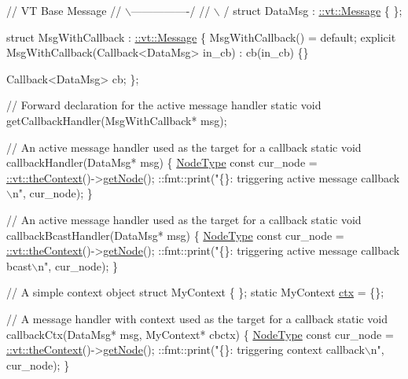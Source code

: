 \begin{DoxyCodeInclude}
\textcolor{comment}{//              VT Base Message}
\textcolor{comment}{//             \(\backslash\)----------------/}
\textcolor{comment}{//              \(\backslash\)              /}
\textcolor{keyword}{struct }DataMsg : \hyperlink{structvt_1_1messaging_1_1_active_msg}{::vt::Message} \{ \};

\textcolor{keyword}{struct }MsgWithCallback : \hyperlink{structvt_1_1messaging_1_1_active_msg}{::vt::Message} \{
  MsgWithCallback() = \textcolor{keywordflow}{default};
  \textcolor{keyword}{explicit} MsgWithCallback(Callback<DataMsg> in\_cb) : cb(in\_cb) \{\}

  Callback<DataMsg> cb;
\};


\textcolor{comment}{// Forward declaration for the active message handler}
\textcolor{keyword}{static} \textcolor{keywordtype}{void} getCallbackHandler(MsgWithCallback* msg);

\textcolor{comment}{// An active message handler used as the target for a callback}
\textcolor{keyword}{static} \textcolor{keywordtype}{void} callbackHandler(DataMsg* msg) \{
  \hyperlink{namespacevt_a866da9d0efc19c0a1ce79e9e492f47e2}{NodeType} \textcolor{keyword}{const} cur\_node = \hyperlink{namespacevt_a26551fe0e6e6a1371111df5b12c7e92c}{::vt::theContext}()->\hyperlink{structvt_1_1ctx_1_1_context_a0d52c263ce8516546a67443d9a86fa5f}{getNode}();
  ::fmt::print(\textcolor{stringliteral}{"\{\}: triggering active message callback\(\backslash\)n"}, cur\_node);
\}

\textcolor{comment}{// An active message handler used as the target for a callback}
\textcolor{keyword}{static} \textcolor{keywordtype}{void} callbackBcastHandler(DataMsg* msg) \{
  \hyperlink{namespacevt_a866da9d0efc19c0a1ce79e9e492f47e2}{NodeType} \textcolor{keyword}{const} cur\_node = \hyperlink{namespacevt_a26551fe0e6e6a1371111df5b12c7e92c}{::vt::theContext}()->\hyperlink{structvt_1_1ctx_1_1_context_a0d52c263ce8516546a67443d9a86fa5f}{getNode}();
  ::fmt::print(\textcolor{stringliteral}{"\{\}: triggering active message callback bcast\(\backslash\)n"}, cur\_node);
\}

\textcolor{comment}{// A simple context object}
\textcolor{keyword}{struct }MyContext \{ \};
\textcolor{keyword}{static} MyContext \hyperlink{namespacevt_1_1config_a0551245b6b893932b95aaf8eac94eed1}{ctx} = \{\};

\textcolor{comment}{// A message handler with context used as the target for a callback}
\textcolor{keyword}{static} \textcolor{keywordtype}{void} callbackCtx(DataMsg* msg, MyContext* cbctx) \{
  \hyperlink{namespacevt_a866da9d0efc19c0a1ce79e9e492f47e2}{NodeType} \textcolor{keyword}{const} cur\_node = \hyperlink{namespacevt_a26551fe0e6e6a1371111df5b12c7e92c}{::vt::theContext}()->\hyperlink{structvt_1_1ctx_1_1_context_a0d52c263ce8516546a67443d9a86fa5f}{getNode}();
  ::fmt::print(\textcolor{stringliteral}{"\{\}: triggering context callback\(\backslash\)n"}, cur\_node);
\}



\end{DoxyCodeInclude}
